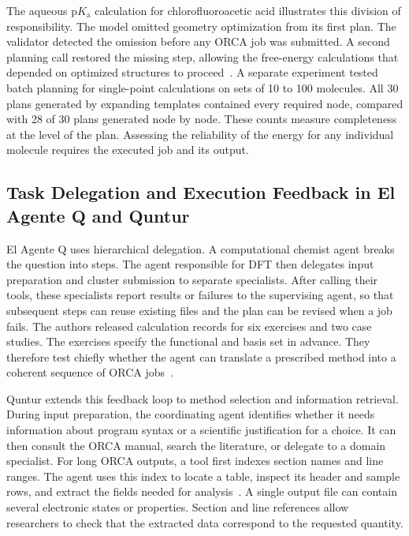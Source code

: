 \documentclass[a4paper,11pt]{article}
\begin{document}
The aqueous $\mathrm{p}K_\mathrm{a}$ calculation for chlorofluoroacetic acid
illustrates this division of responsibility.
The model omitted geometry optimization from its first plan.
The validator detected the omission before any ORCA job was submitted.
A second planning call restored the missing step, allowing the free-energy
calculations that depended on optimized structures to proceed~\cite{qplanner}.
A separate experiment tested batch planning for single-point calculations on
sets of 10 to 100 molecules.
All 30 plans generated by expanding templates contained every required node,
compared with 28 of 30 plans generated node by node.
These counts measure completeness at the level of the plan.
Assessing the reliability of the energy for any individual molecule requires
the executed job and its output.

\subsection{Task Delegation and Execution Feedback in El Agente Q and Quntur}
El Agente Q uses hierarchical delegation.
A computational chemist agent breaks the question into steps.
The agent responsible for DFT then delegates input preparation and cluster
submission to separate specialists.
After calling their tools, these specialists report results or failures to the
supervising agent, so that subsequent steps can reuse existing files and the
plan can be revised when a job fails.
The authors released calculation records for six exercises and two case studies.
The exercises specify the functional and basis set in advance.
They therefore test chiefly whether the agent can translate a prescribed method
into a coherent sequence of ORCA jobs~\cite{agente}.

Quntur extends this feedback loop to method selection and information retrieval.
During input preparation, the coordinating agent identifies whether it needs
information about program syntax or a scientific justification for a choice.
It can then consult the ORCA manual, search the literature, or delegate to a
domain specialist.
For long ORCA outputs, a tool first indexes section names and line ranges.
The agent uses this index to locate a table, inspect its header and sample
rows, and extract the fields needed for analysis~\cite{quntur}.
A single output file can contain several electronic states or properties.
Section and line references allow researchers to check that the extracted data
correspond to the requested quantity.
\end{document}
